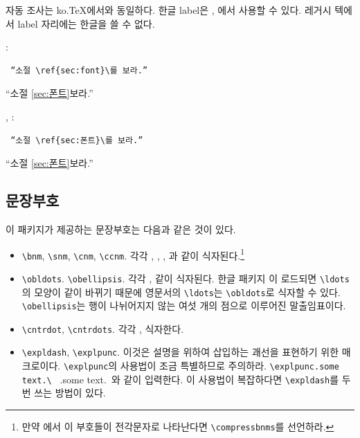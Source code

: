 \documentclass[
	12pt,
	a4paper,
	kosection,
	footnote,
	nobookmarks,
	microtype,
	figtabcapt,
]{oblivoir}
\def\myREF#1#2{\ref{#1}}
\def\myREF#1#2{\ref{#2}}
\def\cs#1{\texttt{\textbackslash #1}}
\begin{document}
자동 조사는 ko.\TeX 에서와 동일하다.
한글 label은 \XeTeX, \LuaTeX 에서 사용할 수 있다.
레거시 텍에서 label 자리에는 한글을 쓸 수 없다. 

\medskip

\noindent{}:\\
\noindent\begin{minipage}{.45\textwidth}
\begin{verbatim}
 “소절 \ref{sec:font}\를 보라.”
\end{verbatim}
\end{minipage}\hfill
\begin{minipage}{.45\textwidth}
\hfill “소절 \myREF{sec:font}{sec:폰트}\를 보라.”
\end{minipage}

\noindent{}, :\\
\noindent\begin{minipage}{.45\textwidth}
\begin{verbatim}
 “소절 \ref{sec:폰트}\를 보라.”
\end{verbatim}
\end{minipage}\hfill
\begin{minipage}{.45\textwidth}
\hfill “소절 \myREF{sec:font}{sec:폰트}\를 보라.”
\end{minipage}


\subsection{문장부호}

이 패키지가 제공하는 문장부호는 다음과 같은 것이 있다.

\begin{itemize}
\item \verb|\bnm|, \verb|\snm|, \verb|\cnm|, \verb|\ccnm|. 각각 , , , 과 같이 식자된다.\footnote{만약 \LuaTeX 에서 이 부호들이
전각문자로 나타난다면 \cs{compressbnms}를 선언하라.}
\item \verb|\obldots|. \verb|\obellipsis|. 각각 \obldots,  같이 식자된다. 한글 패키지 \koTeX 이 로드되면 \verb|\ldots|의 모양이  같이 바뀌기 때문에 영문서의 \verb|\ldots|는 \verb|\obldots|로 식자할 \obldots 수 있다. \verb|\obellipsis|는 행이 나뉘어지지 않는 여섯 개의 점으로 이루어진 말출임표이다.
\item \verb|\cntrdot|, \verb|\cntrdots|. 각각 \cntrdot,  식자한다.
\item \verb|\expldash|, \verb|\explpunc|. 이것은 설명을 위하여 삽입하는 괘선\expldash 을 표현하기 위한 매크로이다. \verb|\explpunc|의 사용법이 조금 특별하므로 주의하라. \verb*|\explpunc.some text.\ | \explpunc.some text.\ 와 같이 입력한다. 이 사용법이 복잡하다면 \verb|\expldash|를 두 번 쓰는 방법이 있다.
\end{itemize}
\end{document}
